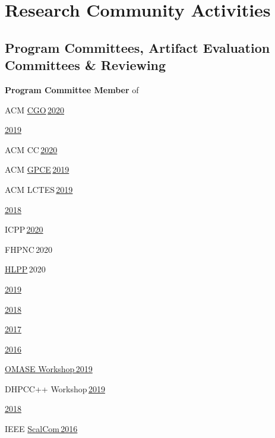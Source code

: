 \documentclass[11pt,a4paper]{moderncv}
\newcommand{\strong}[1]{\textcolor{color1}{\textbf{#1}}}
\newcommand{\highlight}[1]{\textcolor{color1}{#1}}
\begin{document}
\section{Research Community Activities}
\subsection{Program Committees, Artifact Evaluation Committees \& Reviewing}
  \begin{cvitemize}
  \item \strong{Program Committee Member} of
    \begin{inlineItemize}
      \item \highlight{ACM \href{http://cgo.org}{CGO}\,\href{http://cgo.org/}{2020}}
      \item \highlight{\href{http://cgo.org/cgo2019/}{2019}}
      \item \highlight{ACM CC\,\href{https://cc-conference.github.io/20/}{2020}}
      \item \highlight{ACM \href{https://conf.researchr.org/series/gpce}{GPCE}\,\href{https://conf.researchr.org/home/gpce-2019}{2019}}
      \item \highlight{ACM LCTES\,\href{https://conf.researchr.org/home/LCTES-2019}{2019}}
      \item \highlight{\href{https://conf.researchr.org/track/LCTES-2018/LCTES-2018-papers}{2018}}
      \item \highlight{ICPP\,\href{https://jnamaral.github.io/icpp20/}{2020}}
      \item \highlight{FHPNC\,{2020}}
      \item \highlight{\href{http://hlpp.free.fr/}{HLPP}\,2020}
      \item \highlight{\href{https://www.ida.liu.se/conferences/hlpp2019/}{2019}}
      \item \highlight{\href{https://www.univ-orleans.fr/lifo/equipes/LMV/hlpp2018/index.php}{2018}}
      \item \highlight{\href{https://hlpp2017.infor.uva.es/}{2017}}
      \item \highlight{\href{http://hlpp2016.uni-muenster.de/}{2016}}
      \item \highlight{\href{https://omasew.github.io/}{OMASE Workshop\,2019}}
      \item \highlight{DHPCC++ Workshop\,\href{http://sycl.tech/distributed-heterogeneous-programming-in-c-cpp-dhpccpp19.html}{2019}}
      \item \highlight{\href{http://www.iwocl.org/iwocl-2018/dhpcc/}{2018}}
      \item \highlight{IEEE \href{https://scalcom2016.sciencesconf.org/}{ScalCom\,2016}}
    \end{inlineItemize}
\end{cvitemize}
\end{document}
